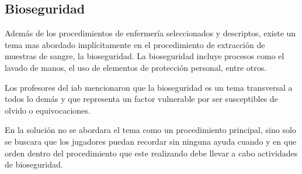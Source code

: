 \subsection{Bioseguridad}

Además de los procedimientos de enfermería seleccionados y descriptos, existe un tema mas abordado implícitamente
en el procedimiento de extracción de muestras de sangre, la bioseguridad. La bioseguridad incluye procesos como el
lavado de manos, el uso de elementos de protección personal, entre otros.

Los profesores del \Gls{iab} mencionaron que la bioseguridad es un tema transversal a todos lo demás y que 
representa un factor vulnerable por ser susceptibles de olvido o equivocaciones.

En la solución no se abordara el tema como un procedimiento principal, sino solo se buscara que los jugadores
puedan recordar sin ninguna ayuda cuando y en que orden dentro del procedimiento que este realizando
debe llevar a cabo actividades de bioseguridad.